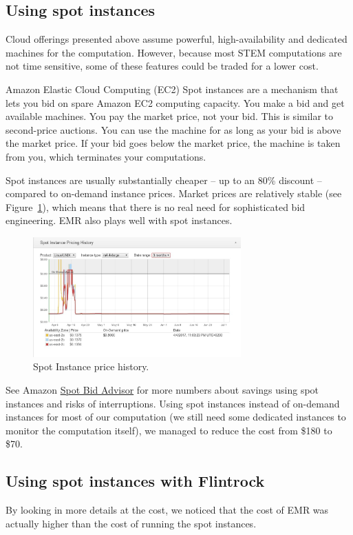 \documentclass{acm_proc_article-sp}
\begin{document}
\subsection{Using spot instances}
Cloud offerings presented above assume powerful,  high-availability and dedicated machines for the computation. However, because most STEM computations are not time sensitive, some of these features could be traded for a lower cost.

Amazon Elastic Cloud Computing (EC2) Spot instances are a mechanism that lets you bid on spare Amazon EC2 computing capacity. You make a bid and get available machines. You pay the market price, not your bid. This is similar to second-price auctions. You can use the machine for as long as your bid is above the market price. If your bid goes below the market price, the machine is taken from you, which terminates your computations. 

Spot instances are usually substantially cheaper -- up to an 80\% discount -- compared to on-demand instance prices. Market prices are relatively stable (see Figure~\ref{fig::spot-price-history}), which means that there is no real need for sophisticated bid engineering. EMR also plays well with spot instances.

\begin{figure}[h]
    \centering
    \includegraphics[width=8cm]{IMG/spot-price.jpg}
    \caption{Spot Instance price history.}
    \label{fig::spot-price-history}
\end{figure}

See Amazon \href{https://aws.amazon.com/ec2/spot/bid-advisor/}{Spot Bid Advisor} for more numbers about savings using spot instances and risks of interruptions.
Using spot instances instead of on-demand instances for most of our computation (we still need some dedicated instances to  monitor the computation itself), we managed to reduce the cost from \$180 to \$70.

\subsection{Using spot instances with Flintrock}
By looking in more details at the cost, we noticed that the cost of EMR was actually higher than the cost of running the spot instances.
\end{document}
